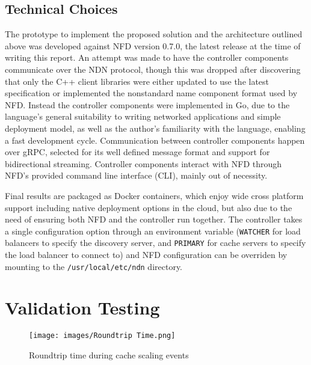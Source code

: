 \documentclass[letterpaper,12pt]{article}
\begin{document}
\subsection*{Technical Choices}

The prototype to implement the proposed solution and the architecture outlined above was developed against NFD version 0.7.0, the latest release at the time of writing this report. An attempt was made to have the controller components communicate over the NDN protocol, though this was dropped after discovering that only the C++ client libraries were either updated to use the latest specification or implemented the nonstandard name component format used by NFD. Instead the controller components were implemented in Go, due to the language's general suitability to writing networked applications and simple deployment model, as well as the author's familiarity with the language, enabling a fast development cycle. Communication between controller components happen over gRPC, selected for its well defined message format and support for bidirectional streaming. Controller components interact with NFD through NFD's provided command line interface (CLI), mainly out of necessity.

Final results are packaged as Docker containers, which enjoy wide cross platform support including native deployment options in the cloud, but also due to the need of ensuring both NFD and the controller run together. The controller takes a single configuration option through an environment variable (\texttt{WATCHER} for load balancers to specify the discovery server, and \texttt{PRIMARY} for cache servers to specify the load balancer to connect to) and NFD configuration can be overriden by mounting to the \texttt{/usr/local/etc/ndn} directory.




\section*{Validation Testing}


\begin{figure}[h]
    \centering
    \texttt{[image: images/Roundtrip Time.png]}
    \caption{Roundtrip time during cache scaling events}
    \label{rt}
\end{figure}
\end{document}
